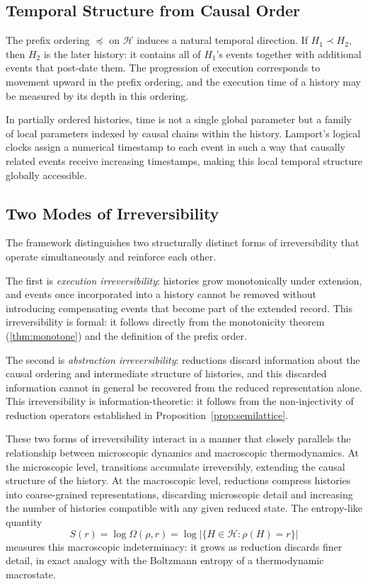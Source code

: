\documentclass[12pt]{article}
\begin{document}
\subsection{Temporal Structure from Causal Order}

The prefix ordering $\preceq$ on $\mathcal{H}$ induces a natural temporal direction. If $H_1 \prec H_2$, then $H_2$ is the later history: it contains all of $H_1$'s events together with additional events that post-date them. The progression of execution corresponds to movement upward in the prefix ordering, and the execution time of a history may be measured by its depth in this ordering.

In partially ordered histories, time is not a single global parameter but a family of local parameters indexed by causal chains within the history. Lamport's logical clocks \cite{lamport1978} assign a numerical timestamp to each event in such a way that causally related events receive increasing timestamps, making this local temporal structure globally accessible.

\subsection{Two Modes of Irreversibility}

The framework distinguishes two structurally distinct forms of irreversibility that operate simultaneously and reinforce each other.

The first is \emph{execution irreversibility}: histories grow monotonically under extension, and events once incorporated into a history cannot be removed without introducing compensating events that become part of the extended record. This irreversibility is formal: it follows directly from the monotonicity theorem (\ref{thm:monotone}) and the definition of the prefix order.

The second is \emph{abstraction irreversibility}: reductions discard information about the causal ordering and intermediate structure of histories, and this discarded information cannot in general be recovered from the reduced representation alone. This irreversibility is information-theoretic: it follows from the non-injectivity of reduction operators established in Proposition~\ref{prop:semilattice}.

These two forms of irreversibility interact in a manner that closely parallels the relationship between microscopic dynamics and macroscopic thermodynamics. At the microscopic level, transitions accumulate irreversibly, extending the causal structure of the history. At the macroscopic level, reductions compress histories into coarse-grained representations, discarding microscopic detail and increasing the number of histories compatible with any given reduced state. The entropy-like quantity
\[
S(r) = \log \Omega(\rho, r) = \log \left| \{ H \in \mathcal{H} : \rho(H) = r \} \right|
\]
measures this macroscopic indeterminacy: it grows as reduction discards finer detail, in exact analogy with the Boltzmann entropy of a thermodynamic macrostate.
\end{document}
